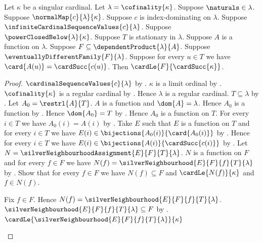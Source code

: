 \begin{theorem}\label{silver_second_almost_disjoint_bound}
    Let $\kappa$ be a singular cardinal.
    Let $\lambda=\cofinality{\kappa}$.
    Suppose $\naturals\in\lambda$.
    Suppose $\normalMap{c}{\lambda}{\kappa}$.
    Suppose $c$ is index-dominating on $\lambda$.
    Suppose $\infiniteCardinalSequenceValues{c}{\lambda}$.
    Suppose $\powerClosedBelow{\lambda}{\kappa}$.
    Suppose $T$ is stationary in $\lambda$.
    Suppose $A$ is a function on $\lambda$.
    Suppose $F\subseteq\dependentProduct{\lambda}{A}$.
    Suppose $\eventuallyDifferentFamily{F}{\lambda}$.
    Suppose for every $u\in T$ we have
        $\card{A(u)}=\cardSucc{c(u)}$.
    Then $\cardLe{F}{\cardSucc{\kappa}}$.
\end{theorem}
\begin{proof}
    $\cardinalSequenceValues{c}{\lambda}$
        by .
    $\kappa$ is a limit ordinal
        by .
    $\cofinality{\kappa}$ is a regular cardinal
        by .
    Hence $\lambda$ is a regular cardinal.
    $T\subseteq\lambda$ by .
    Let $A_0=\restrl{A}{T}$.
    $A$ is a function and $\dom{A}=\lambda$.
    Hence $A_0$ is a function by .
    Hence $\dom{A_0}=T$
        by .
    Hence $A_0$ is a function on $T$.
    For every $i\in T$ we have $A_0(i)=A(i)$
        by .
    Take $E$ such that $E$ is a function on $T$ and
        for every $i\in T$ we have
            $E(i)\in\bijections{A_0(i)}{\card{A_0(i)}}$
        by .
    Hence for every $i\in T$ we have
        $E(i)\in\bijections{A(i)}{\cardSucc{c(i)}}$ by \auto.
    Let $N=\silverNeighbourhoodAssignment{E}{F}{T}{\lambda}$.
    $N$ is a function on $F$ and for every $f\in F$ we have
        $N(f)=\silverNeighbourhood{E}{F}{f}{T}{\lambda}$
        by .
    Show that for every $f\in F$ we have $N(f)\subseteq F$ and
        $\cardLe{N(f)}{\kappa}$ and $f\in N(f)$.
    \begin{subproof}
        Fix $f\in F$.
        Hence $N(f)=\silverNeighbourhood{E}{F}{f}{T}{\lambda}$.
        $\silverNeighbourhood{E}{F}{f}{T}{\lambda}\subseteq F$
            by .
        $\cardLe{\silverNeighbourhood{E}{F}{f}{T}{\lambda}}{\kappa}$

\end{subproof}
\end{proof}
